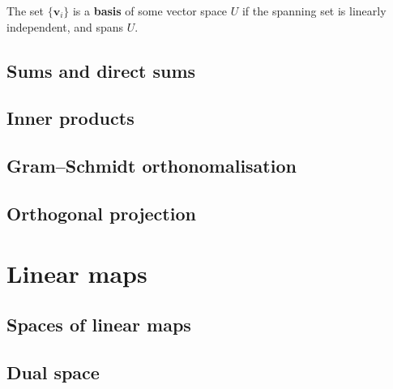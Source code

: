 \documentclass[letter-paper]{tufte-book}
\newcommand{\vb}{{\boldsymbol{v}}}
\begin{document}
The set $\{\vb_i\}$ is a \textbf{basis} of some vector space $U$ if the spanning
set is linearly independent, and spans $U$.


\section{Sums and direct sums}


\section{Inner products}


\section{Gram--Schmidt orthonomalisation}


\section{Orthogonal projection}


\chapter{Linear maps}


\section{Spaces of linear maps}


\section{Dual space}
\end{document}

